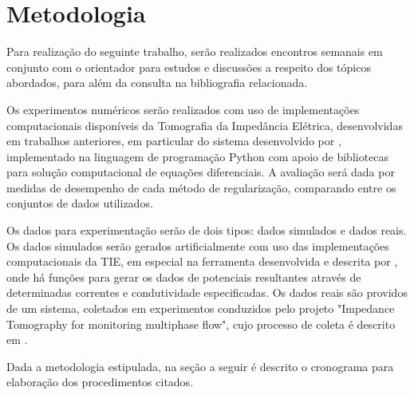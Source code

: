 \chapter{Metodologia}

Para realização do seguinte trabalho, serão realizados encontros semanais em conjunto com o orientador para estudos e discussões a respeito dos tópicos abordados, para além da consulta na bibliografia relacionada. 

Os experimentos numéricos serão realizados com uso de implementações computacionais disponíveis da Tomografia da Impedância Elétrica, desenvolvidas em trabalhos anteriores, em particular do sistema desenvolvido por , implementado na linguagem de programação Python com apoio de bibliotecas para solução computacional de equações diferenciais. A avaliação será dada por medidas de desempenho de cada método de regularização, comparando entre os conjuntos de dados utilizados.

Os dados para experimentação serão de dois tipos: dados simulados e dados reais. Os dados simulados serão gerados artificialmente com uso das implementações computacionais da TIE, em especial na ferramenta desenvolvida e descrita por , onde há funções para gerar os dados de potenciais resultantes através de determinadas correntes e condutividade especificadas. Os dados reais são providos de um sistema, coletados em experimentos conduzidos pelo projeto "Impedance Tomography for monitoring multiphase flow", cujo processo de coleta é descrito em \cite{margotti-eit}.

Dada a metodologia estipulada, na seção a seguir é descrito o cronograma para elaboração dos procedimentos citados.